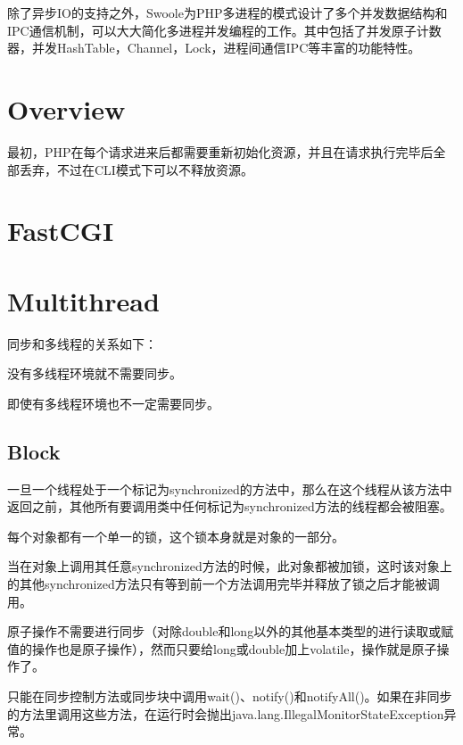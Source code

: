 除了异步IO的支持之外，Swoole为PHP多进程的模式设计了多个并发数据结构和IPC通信机制，可以大大简化多进程并发编程的工作。其中包括了并发原子计数器，并发HashTable，Channel，Lock，进程间通信IPC等丰富的功能特性。


\section{Overview}

最初，PHP在每个请求进来后都需要重新初始化资源，并且在请求执行完毕后全部丢弃，不过在CLI模式下可以不释放资源。



\section{FastCGI}



\section{Multithread}

同步和多线程的关系如下：

\begin{compactenum}
\item 没有多线程环境就不需要同步。
\item 即使有多线程环境也不一定需要同步。 
\end{compactenum}




\subsection{Block}


一旦一个线程处于一个标记为synchronized的方法中，那么在这个线程从该方法中返回之前，其他所有要调用类中任何标记为synchronized方法的线程都会被阻塞。  




每个对象都有一个单一的锁，这个锁本身就是对象的一部分。

当在对象上调用其任意synchronized方法的时候，此对象都被加锁，这时该对象上的其他synchronized方法只有等到前一个方法调用完毕并释放了锁之后才能被调用。

原子操作不需要进行同步（对除double和long以外的其他基本类型的进行读取或赋值的操作也是原子操作），然而只要给long或double加上volatile，操作就是原子操作了。

只能在同步控制方法或同步块中调用wait()、notify()和notifyAll()。如果在非同步的方法里调用这些方法，在运行时会抛出java.lang.IllegalMonitorStateException异常。 

